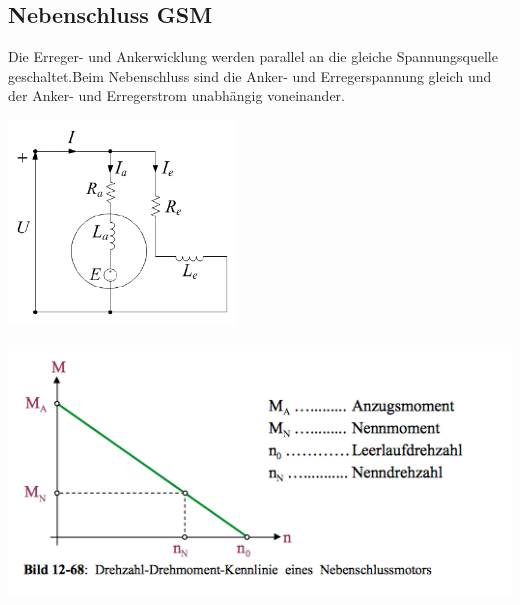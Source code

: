\subsection{Nebenschluss GSM}
    Die Erreger- und Ankerwicklung werden parallel an die gleiche Spannungsquelle geschaltet.\newline Beim Nebenschluss sind die Anker- und Erregerspannung gleich und der Anker- und Erregerstrom unabhängig \newline voneinander. \\
    \begin{minipage}[b]{0.4\textwidth}
    	\raggedright
    	\includegraphics[width=6cm]{images/Nebenschluss_GSM.png}
    \end{minipage}
    \begin{minipage}[b]{0.5\textwidth}
    	\raggedright
    	\includegraphics[scale = 0.6]{images/KennlinieNebenschluss}
    \end{minipage}\\
    
